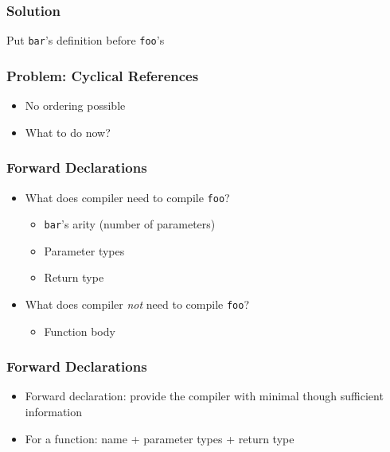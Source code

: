 \begin{frame}
  \frametitle{Solution}
  \begin{center}
    Put {\tt bar}'s definition before {\tt foo}'s
  \end{center}
  \vskip5mm
\end{frame}

\begin{frame}
  \frametitle{Problem: Cyclical References}
  \begin{overprint}
  \end{overprint}
  \begin{itemize}
    \item No ordering possible
    \item What to do now?
  \end{itemize}
\end{frame}

\begin{frame}
  \frametitle{Forward Declarations}
  \begin{itemize}
    \item What does compiler need to compile {\tt foo}?
          \begin{itemize}
            \item<2-> {\tt bar}'s arity (number of parameters)
            \item<3-> Parameter types
            \item<4-> Return type
          \end{itemize}
    \item<5-> What does compiler \emph{not} need to compile {\tt foo}?
          \begin{itemize}
            \item Function body
          \end{itemize}
  \end{itemize}
\end{frame}

\begin{frame}
  \frametitle{Forward Declarations}
  \begin{overprint}
  \end{overprint}
  \begin{itemize}
    \item Forward declaration: provide the compiler with minimal though sufficient information
    \item For a function: name + parameter types + return type
  \end{itemize}
\end{frame}

